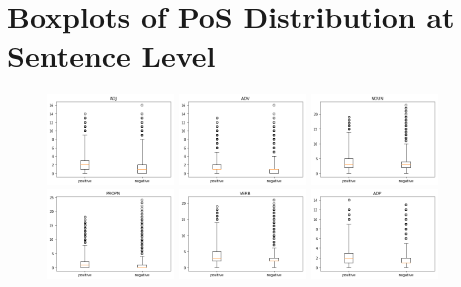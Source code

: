 \documentclass[12pt]{diazessay} %
\begin{document}
{\section{Boxplots of PoS Distribution at Sentence Level} %
\label{sec:appendix_b}
    \begin{figure}[h!]
    \includegraphics[width=0.3\textwidth]{graphs/box_pos/1.png}
    \includegraphics[width=0.3\textwidth]{graphs/box_pos/2.png}
    \includegraphics[width=0.3\textwidth]{graphs/box_pos/3.png}
    \includegraphics[width=0.3\textwidth]{graphs/box_pos/4.png}
    \includegraphics[width=0.3\textwidth]{graphs/box_pos/5.png}
    \includegraphics[width=0.3\textwidth]{graphs/box_pos/6.png}

\end{figure}}
\end{document}
